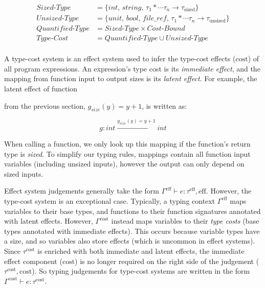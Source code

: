 \vspace{1mm}

\begin{align*}
  \mathit{Sized\text{-}Type}      & = \{ \textit{int, string, } \tau_1 * \cdots \tau_n \rightarrow \tau_{\textrm{sized}} \}             \\
  \mathit{Unsized\text{-}Type}    & = \{ \textit{unit, bool, file\_ref, } \tau_1 * \cdots \tau_n \rightarrow \tau_{\textrm{unsized}} \} \\
  \mathit{Quantified\text{-}Type} & = \mathit{Sized\text{-}Type} \times \mathit{Cost\text{-}Bound}                                       \\
  \mathit{Type\text{-}Cost}       & = \mathit{Quantified\text{-}Type} \cup \mathit{Unsized\text{-}Type}                                 \\
\end{align*}

\vspace{-6mm}

A type-cost system is an effect system used to infer the type-cost effects (\( \textrm{cost} \)) of all program expressions. An expression's type cost is its \textit{immediate effect}, and the mapping from function input to output sizes is its \textit{latent effect}. For example, the latent effect of function  from the previous section, \( { g_{\textit{size}}(y) = y + 1 } \), is written as:

\[ g : int \xrightarrow{g_{\textit{size}}(y) = y + 1} int \]

When calling a function, we only look up this mapping if the function's return type is \textit{sized}. To simplify our typing rules, mappings contain all function input variables (including unsized inputs), however the output can only depend on sized inputs.

Effect system judgements generally take the form \( \Gamma^\textrm{eff} \vdash e : \tau^\textrm{eff}, \textrm{eff} \). However, the type-cost system is an exceptional case. Typically, a typing context \( \Gamma^\textrm{eff} \) maps variables to their base types, and functions to their function signatures annotated with latent effects. However, \( \Gamma^\textrm{cost} \) instead maps variables to their \textit{type costs} (base types annotated with immediate effects). This occurs because variable types have a size, and so variables also store effects (which is uncommon in effect systems). Since \( \tau^\textrm{cost} \) is enriched with both immediate and latent effects, the immediate effect component (\( \textrm{cost} \)) is no longer required on the right side of the judgement (\( \tau^\textrm{cost}, \textrm{cost} \)). So typing judgements for type-cost systems are written in the form \( \Gamma^\textrm{cost} \vdash e : \tau^\textrm{cost} \).

